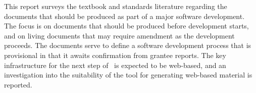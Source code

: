 This report surveys the textbook and standards literature regarding the documents
that should be produced as part of a major software development.
The focus is on documents that should be produced before development
starts, and on living documents that may require amendment as the development proceeds.
The documents serve to define a software development process that is provisional
in that it awaits confirmation from grantee reports. The key infrastructure 
for the next step of \nep\ is expected  to be web-based, and an investigation
into the suitability of the  tool for generating web-based material
is reported.
